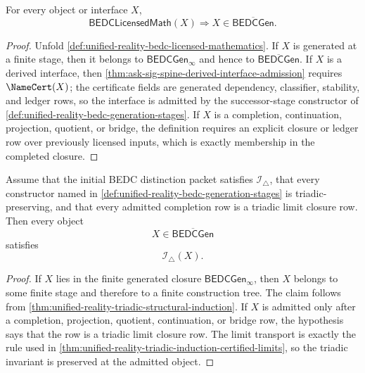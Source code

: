 \begin{theorem}
\label{thm:unified-reality-internal-bedc-math-in-generated-closure}
For every object or interface $X$,
$$
\mathsf{BEDCLicensedMath}(X)
\Longrightarrow
X\in\overline{\mathsf{BEDCGen}}.
$$
\end{theorem}

\begin{proof}
Unfold \autoref{def:unified-reality-bedc-licensed-mathematics}. If
$X$ is generated at a finite stage, then it belongs to
$\mathsf{BEDCGen}_{\infty}$ and hence to
$\overline{\mathsf{BEDCGen}}$. If $X$ is a derived interface, then
\autoref{thm:ask-sig-spine-derived-interface-admission} requires
$\NameCert(X)$; the certificate fields are generated dependency,
classifier, stability, and ledger rows, so the interface is admitted by
the successor-stage constructor of
\autoref{def:unified-reality-bedc-generation-stages}. If $X$ is a
completion, continuation, projection, quotient, or bridge, the
definition requires an explicit closure or ledger row over previously
licensed inputs, which is exactly membership in the completed closure.
\end{proof}

\begin{theorem}
\label{thm:unified-reality-generated-closure-carries-triadic-invariant}
Assume that the initial BEDC distinction packet satisfies
$\mathcal I_{\triangle}$, that every constructor named in
\autoref{def:unified-reality-bedc-generation-stages} is
triadic-preserving, and that every admitted completion row is a triadic
limit closure row. Then every object
$$
X\in\overline{\mathsf{BEDCGen}}
$$
satisfies
$$
\mathcal I_{\triangle}(X).
$$
\end{theorem}

\begin{proof}
If $X$ lies in the finite generated closure
$\mathsf{BEDCGen}_{\infty}$, then $X$ belongs to some finite stage and
therefore to a finite construction tree. The claim follows from
\autoref{thm:unified-reality-triadic-structural-induction}. If $X$ is
admitted only after a completion, projection, quotient, continuation, or
bridge row, the hypothesis says that the row is a triadic limit closure
row. The limit transport is exactly the rule used in
\autoref{thm:unified-reality-triadic-induction-certified-limits}, so the
triadic invariant is preserved at the admitted object.
\end{proof}


